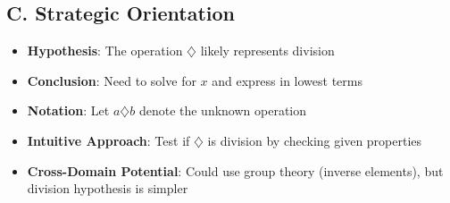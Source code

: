 \documentclass[11pt]{article}
\begin{document}
\begin{problemconfigbox}
\subsection*{C. Strategic Orientation}
\begin{itemize}[leftmargin=*]
    \item \textbf{Hypothesis}: The operation $\diamondsuit$ likely represents division
    \item \textbf{Conclusion}: Need to solve for $x$ and express in lowest terms
    \item \textbf{Notation}: Let $a \diamondsuit b$ denote the unknown operation
    \item \textbf{Intuitive Approach}: Test if $\diamondsuit$ is division by checking given properties
    \item \textbf{Cross-Domain Potential}: Could use group theory (inverse elements), but division hypothesis is simpler
\end{itemize}
\end{problemconfigbox}
\end{document}
